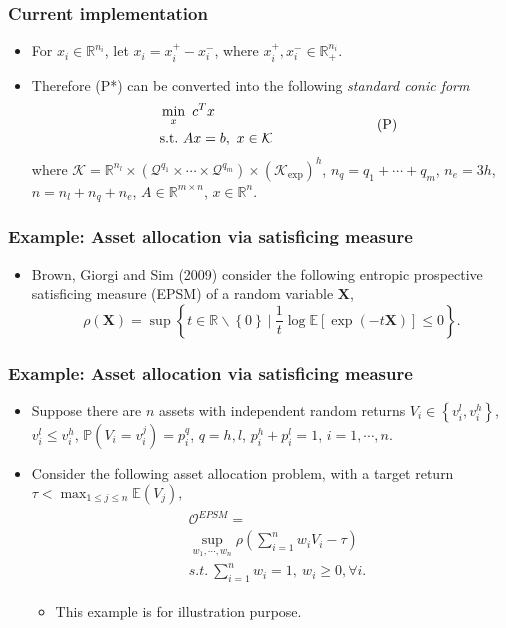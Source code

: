 \documentclass{beamer}
\begin{document}
\begin{frame}
	\frametitle{Current implementation}
	\begin{itemize}
		\item For $x_i\in \mathbb{R}^{n_i}$, let $x_i = x_i^+ - x_i^-$, where $x_i^+, x_i^- \in \mathbb{R}_+^{n_i}$.
		\item Therefore (P*) can be converted into the following \textit{standard conic form}
		\begin{align*}
		\begin{split}
		\quad &\min_x\,\, c^Tx\\
		& \text{s.t.}\,\, A x = b,\ x \in \mathcal{K}
		\end{split} \quad\quad\quad\quad\quad\quad\quad\,\,\, \textnormal{(P)}
		\end{align*}
		where $ \mathcal{K} = \mathbb{R}^{n_l} \times \left(\mathcal{Q}^{q_1}\times\cdots\times \mathcal{Q}^{q_{m}}\right)\times \left(\mathcal{K}_{\exp}\right)^h$,
		$n_q = q_1 + \cdots + q_m$, $n_e = 3h$, $n=n_l+n_q+n_e$, $A\in \mathbb{R}^{m\times n}$, $x\in \mathbb{R}^n$.
	\end{itemize}
\end{frame}

\begin{frame}
	\frametitle{Example: Asset allocation via satisficing measure}
	\begin{itemize}
		\item Brown, Giorgi and Sim (2009) consider the following entropic prospective satisficing measure (EPSM) of a random variable $\boldsymbol{X}$,
		\[\rho(\boldsymbol{X}) = \sup \left\{t\in \mathbb{R}\backslash \left\{0\right\} \ \big\rvert\ \dfrac{1}{t}\log \mathbb{E} \left[\exp\left(-t\boldsymbol{X}\right)\right] \leq 0 \right\}. \]
	\end{itemize}
\end{frame}

\begin{frame}
	\frametitle{Example: Asset allocation via satisficing measure}
	\begin{itemize}
		\item Suppose there are $n$ assets with independent random returns $V_i\in \left\{v^l_i, v^h_i \right\}$, $v^l_i\leq v^h_i$, $\mathbb{P}\left(V_i = v^j_i\right) = p^q_i$, $q=h,l$, $p^h_i+p^l_i=1$, $i=1,\cdots, n$.
		\item Consider the following asset allocation problem, with a target return $\tau < \max_{1\leq j\leq n} \mathbb{E}\left(V_j\right),$
		\begin{align} \label{satisficing_original}
		\begin{split}
		& \mathcal{O}^{EPSM} = \\
		& \sup_{w_1, \cdots, w_n} \rho\left(\sum_{i=1}^n w_iV_i - \tau\right) \\
		& \textit{s.t.}\ \sum_{i=1}^n w_i = 1,\ w_i\geq 0,\forall i.
		\end{split}
		\end{align}
		\begin{itemize}
			\item This example is for illustration purpose.
		\end{itemize}
	\end{itemize}
\end{frame}
\end{document}
